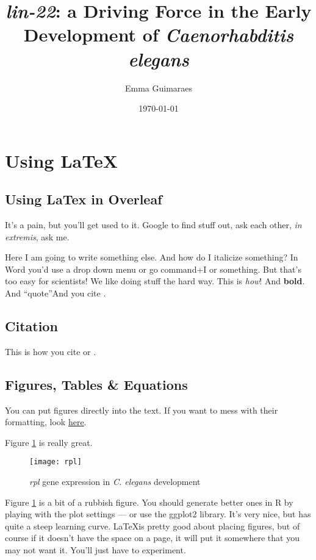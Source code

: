\documentclass{article}[12pt]
\title{\emph{lin-22}: a Driving Force in the Early Development of \textit{Caenorhabditis elegans}}
\author{Emma Guimaraes}
\date{\today}
\begin{document}
\maketitle
\tableofcontents
\newpage




\section{Using LaTeX}

\subsection{Using LaTex in Overleaf}

It's a pain, but you'll get used to it.  Google to find stuff out, ask each other, \emph{in extremis}, ask me. 

Here I am going to write something else. And how do I italicize something?  In Word you'd use a drop down menu or go command+I or something. But that's too easy for scientists! We like doing stuff the hard way.  This is \emph{how}! And \textbf{bold}.  And ``quote''And you cite \cite{Levin2012}. 
\subsection{Citation}
This is how you cite \cite{Levin2012} or \parencite{Goldstein1995}.

\subsection{Figures, Tables \& Equations}

You can put figures directly into the text. If you want to mess with their formatting, look \href{http://en.wikibooks.org/wiki/LaTeX/Floats,_Figures_and_Captions}{here}.

Figure \ref{fig:rpl} is really great. 

\begin{figure}[h]
\centering
\texttt{[image: rpl]}
\caption{\emph{rpl} gene expression in \emph{C. elegans} development}
\label{fig:rpl}
\end{figure}

Figure \ref{fig:rpl} is a bit of a rubbish figure. You should generate better ones in R by playing with the plot settings --- or use the ggplot2 library. It's very nice, but has quite a steep learning curve. \LaTeX is pretty good about placing figures, but of course if it doesn't have the space on a page, it will put it somewhere that you may not want it. You'll just have to experiment. 
\end{document}

